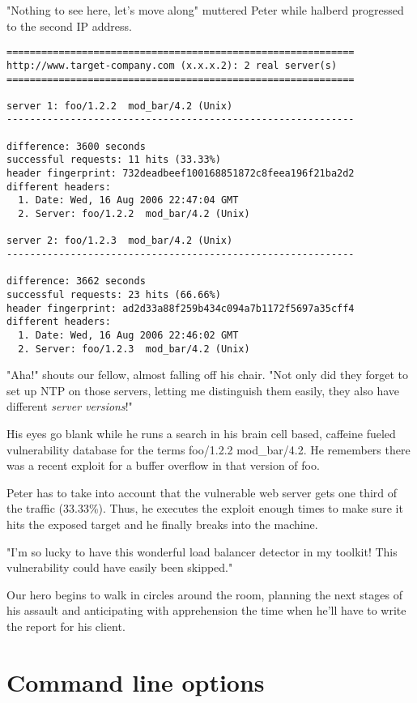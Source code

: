 \documentclass[a4paper]{book}
\begin{document}
"Nothing to see here, let's move along" muttered Peter while halberd
progressed to the second IP address.

\begin{verbatim}
============================================================
http://www.target-company.com (x.x.x.2): 2 real server(s)
============================================================

server 1: foo/1.2.2  mod_bar/4.2 (Unix)
------------------------------------------------------------

difference: 3600 seconds
successful requests: 11 hits (33.33%)
header fingerprint: 732deadbeef100168851872c8feea196f21ba2d2
different headers:
  1. Date: Wed, 16 Aug 2006 22:47:04 GMT
  2. Server: foo/1.2.2  mod_bar/4.2 (Unix)

server 2: foo/1.2.3  mod_bar/4.2 (Unix)
------------------------------------------------------------

difference: 3662 seconds
successful requests: 23 hits (66.66%)
header fingerprint: ad2d33a88f259b434c094a7b1172f5697a35cff4
different headers:
  1. Date: Wed, 16 Aug 2006 22:46:02 GMT
  2. Server: foo/1.2.3  mod_bar/4.2 (Unix)
\end{verbatim}

"Aha!" shouts our fellow, almost falling off his chair.  "Not only did they
forget to set up NTP on those servers, letting me distinguish them easily,
they also have different \emph{server versions}!"

His eyes go blank while he runs a search in his brain cell based, caffeine
fueled vulnerability database for the terms foo/1.2.2 mod\_bar/4.2.  He
remembers there was a recent exploit for a buffer overflow in that version of
foo.

Peter has to take into account that the vulnerable web server gets one third
of the traffic (33.33\%).  Thus, he executes the exploit enough times to make
sure it hits the exposed target and he finally breaks into the machine.

"I'm so lucky to have this wonderful load balancer detector in my toolkit!
This vulnerability could have easily been skipped."

Our hero begins to walk in circles around the room, planning the next stages
of his assault and anticipating with apprehension the time when he'll have to
write the report for his client.

\section{Command line options}
\end{document}
